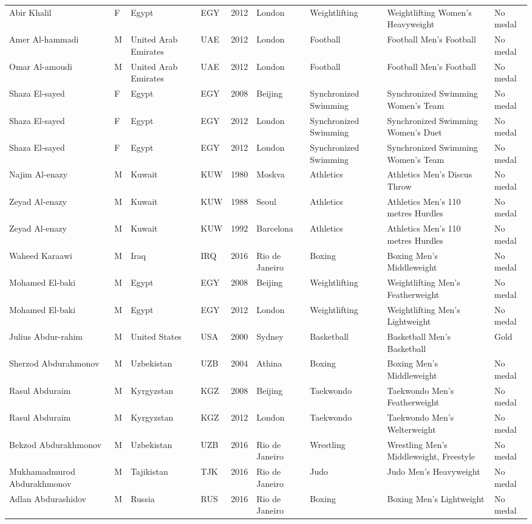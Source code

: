\documentclass{article}%
\begin{document}
\begin{longtable}{p{1.5cm} p{0.5cm} p{2cm} p{1cm} p{1cm} p{1.5cm} p{1.5cm} p{5cm} p{1.5cm}}
Abir Khalil&F&Egypt&EGY&2012&London&Weightlifting&Weightlifting Women's Heavyweight&No medal\\%
Amer Al{-}hammadi&M&United Arab Emirates&UAE&2012&London&Football&Football Men's Football&No medal\\%
Omar Al{-}amoudi&M&United Arab Emirates&UAE&2012&London&Football&Football Men's Football&No medal\\%
Shaza El{-}sayed&F&Egypt&EGY&2008&Beijing&Synchronized Swimming&Synchronized Swimming Women's Team&No medal\\%
Shaza El{-}sayed&F&Egypt&EGY&2012&London&Synchronized Swimming&Synchronized Swimming Women's Duet&No medal\\%
Shaza El{-}sayed&F&Egypt&EGY&2012&London&Synchronized Swimming&Synchronized Swimming Women's Team&No medal\\%
Najim Al{-}enazy&M&Kuwait&KUW&1980&Moskva&Athletics&Athletics Men's Discus Throw&No medal\\%
Zeyad Al{-}enazy&M&Kuwait&KUW&1988&Seoul&Athletics&Athletics Men's 110 metres Hurdles&No medal\\%
Zeyad Al{-}enazy&M&Kuwait&KUW&1992&Barcelona&Athletics&Athletics Men's 110 metres Hurdles&No medal\\%
Waheed Karaawi&M&Iraq&IRQ&2016&Rio de Janeiro&Boxing&Boxing Men's Middleweight&No medal\\%
Mohamed El{-}baki&M&Egypt&EGY&2008&Beijing&Weightlifting&Weightlifting Men's Featherweight&No medal\\%
Mohamed El{-}baki&M&Egypt&EGY&2012&London&Weightlifting&Weightlifting Men's Lightweight&No medal\\%
Julius Abdur{-}rahim&M&United States&USA&2000&Sydney&Basketball&Basketball Men's Basketball&Gold\\%
Sherzod Abdurahmonov&M&Uzbekistan&UZB&2004&Athina&Boxing&Boxing Men's Middleweight&No medal\\%
Rasul Abduraim&M&Kyrgyzstan&KGZ&2008&Beijing&Taekwondo&Taekwondo Men's Featherweight&No medal\\%
Rasul Abduraim&M&Kyrgyzstan&KGZ&2012&London&Taekwondo&Taekwondo Men's Welterweight&No medal\\%
Bekzod Abdurakhmonov&M&Uzbekistan&UZB&2016&Rio de Janeiro&Wrestling&Wrestling Men's Middleweight, Freestyle&No medal\\%
Mukhamadmurod Abdurakhmonov&M&Tajikistan&TJK&2016&Rio de Janeiro&Judo&Judo Men's Heavyweight&No medal\\%
Adlan Abdurashidov&M&Russia&RUS&2016&Rio de Janeiro&Boxing&Boxing Men's Lightweight&No medal\\%

\end{longtable}
\end{document}
